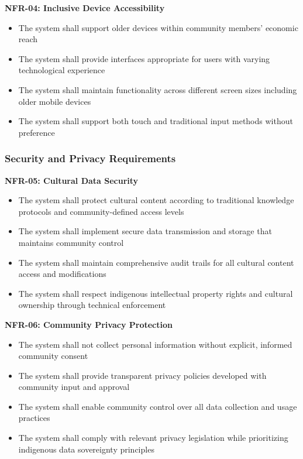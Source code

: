 \textbf{NFR-04: Inclusive Device Accessibility}
\begin{itemize}
    \item The system shall support older devices within community members' economic reach
    \item The system shall provide interfaces appropriate for users with varying technological experience
    \item The system shall maintain functionality across different screen sizes including older mobile devices
    \item The system shall support both touch and traditional input methods without preference
\end{itemize}

\subsubsection{Security and Privacy Requirements}
\label{subsubsec:security_requirements}

\textbf{NFR-05: Cultural Data Security}
\begin{itemize}
    \item The system shall protect cultural content according to traditional knowledge protocols and community-defined access levels
    \item The system shall implement secure data transmission and storage that maintains community control
    \item The system shall maintain comprehensive audit trails for all cultural content access and modifications
    \item The system shall respect indigenous intellectual property rights and cultural ownership through technical enforcement
\end{itemize}

\textbf{NFR-06: Community Privacy Protection}
\begin{itemize}
    \item The system shall not collect personal information without explicit, informed community consent
    \item The system shall provide transparent privacy policies developed with community input and approval
    \item The system shall enable community control over all data collection and usage practices
    \item The system shall comply with relevant privacy legislation while prioritizing indigenous data sovereignty principles
\end{itemize}

